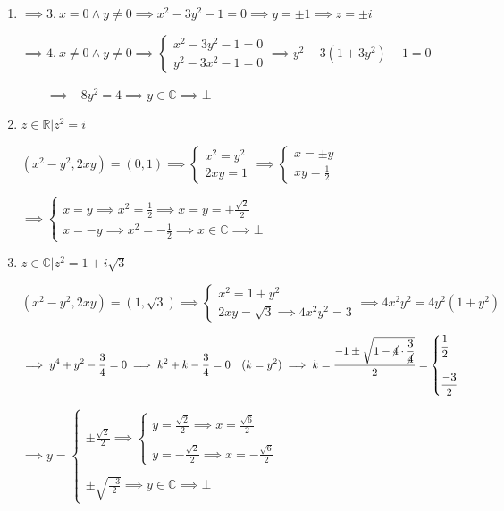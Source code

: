 \documentclass[12pt, openright, a4paper, twoside, english, brazil]{article}
\newenvironment{qitem}{
  \color{black}
\item}{\vspace{10pt}}
\begin{document}
\begin{enumerate}[\bfseries 1.]
\begin{qitem}
    $\implies 3. \ x=0\wedge y\ne 0\implies x^2-3y^2-1=0\implies
    y=\pm 1\implies z=\pm i$

    $\implies 4. \ x\ne 0\wedge y\ne 0\implies
    \begin{cases}x^2-3y^2-1=0\\y^2-3x^2-1=0
    \end{cases}\implies y^2-3(1+3y^2)-1=0$

    $\qquad\implies -8y^2=4\implies
    y\in\mathbb C\implies \bot$
  \end{qitem}

  \begin{qitem} %
    $z\in\mathbb R|z^2=i$

    \color{red}
    $(x^2-y^2,2xy)=(0,1)\implies
    \begin{cases}x^2=y^2\\2xy=1
    \end{cases}\implies
    \begin{cases}x=\pm y\\xy=\frac12
    \end{cases}$

    $\implies
    \begin{cases}x=y\implies\displaystyle x^2=\frac12\implies\displaystyle
      x=y=\pm\frac{\sqrt{2}}2\\

      \displaystyle x=-y\implies x^2=-\frac12\implies x\in\mathbb C\implies \bot
    \end{cases}$
  \end{qitem}

  \begin{qitem} %
    $z\in\mathbb C|z^2=1+i\sqrt{3}$

    \color{red}
    $(x^2-y^2,2xy)=(1,\sqrt{3})\implies
    \begin{cases}x^2=1+y^2\\2xy=\sqrt{3}\implies 4x^2y^2=3
    \end{cases}\implies 4x^2y^2=4y^2(1+y^2)$

    $\displaystyle \implies y^4+y^2-\frac34=0\implies k^2+k-\frac34=0
    \quad (k=y^2)\implies
    k=\frac{-1\pm\sqrt{1-\cancel{4}\cdot\displaystyle\frac{3}{\cancel{4}}}}{2}=
    \begin{cases}\displaystyle\frac12\\\\\displaystyle\frac{-3}{2}
    \end{cases}$

    $\implies y=
    \begin{cases}\displaystyle\pm\frac{\sqrt{2}}{2}\implies
      \begin{cases}\displaystyle
        y=\frac{\sqrt{2}}{2}\implies x=\frac{\sqrt{6}}{2}\\\\
        \displaystyle
        y=-\frac{\sqrt{2}}{2}\implies x=-\frac{\sqrt{6}}{2}
      \end{cases}
      \\\\\displaystyle\pm\sqrt{\frac{-3}{2}}\implies
      y\in\mathbb C\implies \bot
    \end{cases}$


\end{qitem}
\end{enumerate}
\end{document}
